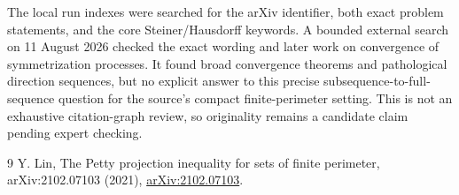 \documentclass[11pt]{article}
\begin{document}
The local run indexes were searched for the arXiv identifier, both exact
problem statements, and the core Steiner/Hausdorff keywords. A bounded
external search on 11 August 2026 checked the exact wording and later work on
convergence of symmetrization processes. It found broad convergence theorems
and pathological direction sequences, but no explicit answer to this precise
subsequence-to-full-sequence question for the source's compact finite-perimeter
setting. This is not an exhaustive citation-graph review, so originality
remains a candidate claim pending expert checking.

\begin{thebibliography}{9}
Y. Lin,
\newblock The Petty projection inequality for sets of finite perimeter,
\newblock arXiv:2102.07103 (2021),
\href{https://arxiv.org/abs/2102.07103}{arXiv:2102.07103}.
\end{thebibliography}
\end{document}

